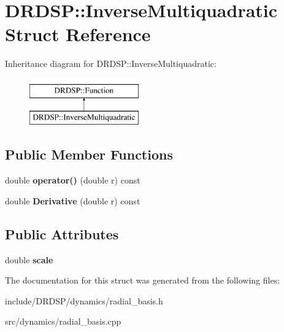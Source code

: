 \hypertarget{struct_d_r_d_s_p_1_1_inverse_multiquadratic}{\section{D\-R\-D\-S\-P\-:\-:Inverse\-Multiquadratic Struct Reference}
\label{struct_d_r_d_s_p_1_1_inverse_multiquadratic}
}
Inheritance diagram for D\-R\-D\-S\-P\-:\-:Inverse\-Multiquadratic\-:\begin{figure}[H]
\begin{center}
\leavevmode
\includegraphics[height=2.000000cm]{struct_d_r_d_s_p_1_1_inverse_multiquadratic}
\end{center}
\end{figure}
\subsection*{Public Member Functions}
\begin{DoxyCompactItemize}
\item 
\hypertarget{struct_d_r_d_s_p_1_1_inverse_multiquadratic_a513dbe313c51ad9ba2c9397c987563f7}{double {\bfseries operator()} (double r) const }\label{struct_d_r_d_s_p_1_1_inverse_multiquadratic_a513dbe313c51ad9ba2c9397c987563f7}

\item 
\hypertarget{struct_d_r_d_s_p_1_1_inverse_multiquadratic_af6a5298e54581ec417a06335c3757744}{double {\bfseries Derivative} (double r) const }\label{struct_d_r_d_s_p_1_1_inverse_multiquadratic_af6a5298e54581ec417a06335c3757744}

\end{DoxyCompactItemize}
\subsection*{Public Attributes}
\begin{DoxyCompactItemize}
\item 
\hypertarget{struct_d_r_d_s_p_1_1_inverse_multiquadratic_a39009875f833958785889ac9373ad37c}{double {\bfseries scale}}\label{struct_d_r_d_s_p_1_1_inverse_multiquadratic_a39009875f833958785889ac9373ad37c}

\end{DoxyCompactItemize}


The documentation for this struct was generated from the following files\-:\begin{DoxyCompactItemize}
\item 
include/\-D\-R\-D\-S\-P/dynamics/radial\-\_\-basis.\-h\item 
src/dynamics/radial\-\_\-basis.\-cpp\end{DoxyCompactItemize}
